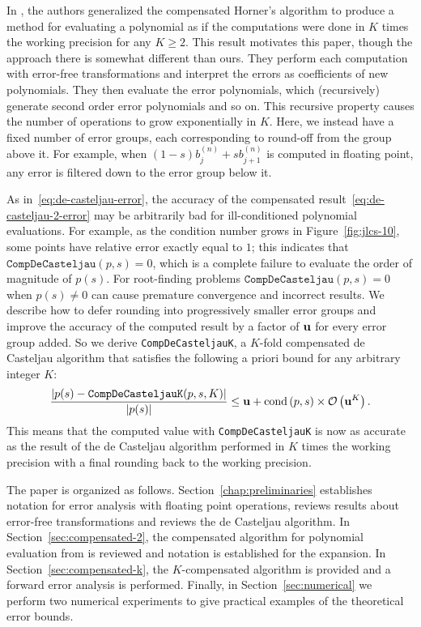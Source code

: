 In \cite{Graillat2009}, the authors generalized the compensated Horner's
algorithm to produce a method for evaluating a polynomial as if
the computations were done in \(K\) times the working precision for
any \(K \geq 2\). This result motivates this paper, though the
approach there is somewhat different than ours. They perform each computation
with error-free transformations and interpret the errors as coefficients of new
polynomials. They then evaluate the error polynomials, which (recursively)
generate second order error polynomials and so on. This recursive property
causes the number of operations to grow exponentially in \(K\). Here, we
instead have a fixed number of error groups, each corresponding to round-off
from the group above it. For example, when
\((1 - s) b_j^{(n)} + s b_{j + 1}^{(n)}\) is computed in floating point, any
error is filtered down to the error group below it.

As in~\eqref{eq:de-casteljau-error}, the accuracy of the compensated
result~\eqref{eq:de-casteljau-2-error} may be arbitrarily bad for ill-conditioned
polynomial evaluations. For example, as the condition number grows in
Figure~\ref{fig:jlcs-10}, some points have relative error exactly equal to
\(1\); this indicates that \(\mathtt{CompDeCasteljau}(p, s) = 0\), which is
a complete failure to evaluate the order of magnitude of \(p(s)\). For
root-finding problems \(\mathtt{CompDeCasteljau}(p, s) = 0\) when
\(p(s) \neq 0\) can cause premature convergence and incorrect results.
We describe how to defer rounding into progressively
smaller error groups and improve the accuracy of the computed result by a
factor of \(\mathbf{u}\) for every error group added. So we derive
\texttt{CompDeCasteljauK}, a \(K\)-fold compensated de Casteljau algorithm
that satisfies the following a priori bound for any arbitrary integer \(K\):
\begin{equation}
  \frac{\left|p(s) - \mathtt{CompDeCasteljauK}(p, s, K)\right|}{
    \left|p(s)\right|} \leq \mathbf{u} + \operatorname{cond}\left(p, s\right) \times
    \mathcal{O}\left(\mathbf{u}^K\right).
\end{equation}
This means that the computed value with \texttt{CompDeCasteljauK} is now
as accurate as the result of the de Casteljau algorithm performed in
\(K\) times the working precision with a final rounding back to the
working precision.

The paper is organized as follows. Section~\ref{chap:preliminaries} establishes
notation for error analysis with floating point operations, reviews
results about error-free transformations and reviews the
de Casteljau algorithm. In Section~\ref{sec:compensated-2},
the compensated algorithm for polynomial evaluation from \cite{Jiang2010} is
reviewed and notation is established for the expansion. In
Section~\ref{sec:compensated-k}, the \(K\)-compensated algorithm is provided
and a forward error analysis is performed. Finally, in
Section~\ref{sec:numerical} we perform two numerical experiments to
give practical examples of the theoretical error bounds.

